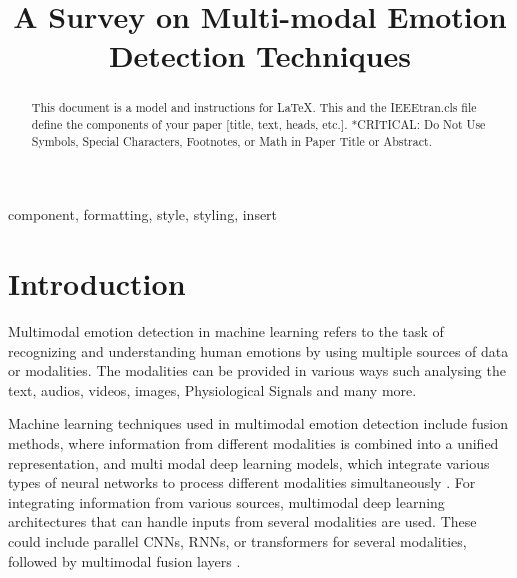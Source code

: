 \documentclass[conference]{IEEEtran}
\begin{document}
\title{A Survey on Multi-modal Emotion Detection Techniques\\

}

\author{
\and
{}
}

\maketitle

\begin{abstract}
This document is a model and instructions for \LaTeX.
This and the IEEEtran.cls file define the components of your paper [title, text, heads, etc.]. *CRITICAL: Do Not Use Symbols, Special Characters, Footnotes, 
or Math in Paper Title or Abstract.
\end{abstract}

\begin{IEEEkeywords}
component, formatting, style, styling, insert
\end{IEEEkeywords}

\section{Introduction}
Multimodal emotion detection in machine learning refers to the task of recognizing and understanding human emotions by using multiple sources of data or modalities. \cite{hina2022multimodal}
The modalities can  be provided in various ways such analysing the text, audios, videos, images, Physiological Signals and many more.

Machine learning techniques used in multimodal emotion detection include fusion methods, where information from different modalities is combined into a unified representation, and multi modal deep learning models, which integrate various types of neural networks to process different modalities simultaneously \cite{joshi2022cogmen}. For integrating information from various sources, multimodal deep learning architectures that can handle inputs from several modalities are used. These could include parallel CNNs, RNNs, or transformers for several modalities, followed by multimodal fusion layers \cite{sharafi2022novel}. 
\end{document}
